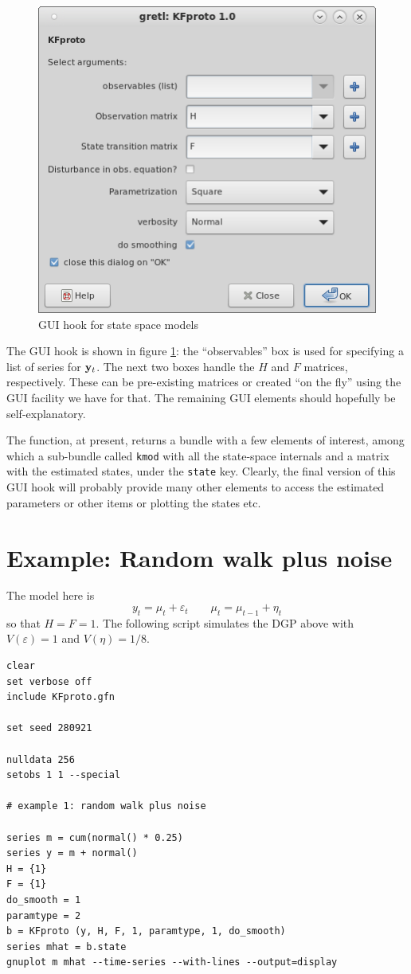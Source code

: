 \documentclass[a4paper]{article}
\newcommand{\obs}{\ensuremath\mathbf{y}_t}
\begin{document}
\begin{figure}[htbp]
  \centering
  \includegraphics[scale=0.5]{GUIScreenshot.png}
  \caption{GUI hook for state space models}
  \label{fig:GUI}
\end{figure}

The GUI hook is shown in figure \ref{fig:GUI}: the ``observables'' box
is used for specifying a list of series for $\obs$. The next two boxes
handle the $H$ and $F$ matrices, respectively. These can be
pre-existing matrices or created ``on the fly'' using the GUI facility
we have for that. The remaining GUI elements should hopefully be
self-explanatory.

The function, at present, returns a bundle with a few elements of
interest, among which a sub-bundle called \texttt{kmod} with all the
state-space internals and a matrix with the estimated states, under
the \texttt{state} key. Clearly, the final version of this GUI hook
will probably provide many other elements to access the estimated
parameters or other items or plotting the states etc.

\section*{Example: Random walk plus noise}

The model here is
\[
  y_t = \mu_t + \varepsilon_t \qquad \mu_t = \mu_{t-1} + \eta_t
\]
so that $H = F = 1$. The following script simulates the DGP above
with $V(\varepsilon) = 1$ and $V(\eta) = 1/8$.

\begin{verbatim}
clear
set verbose off
include KFproto.gfn

set seed 280921

nulldata 256
setobs 1 1 --special

# example 1: random walk plus noise

series m = cum(normal() * 0.25)
series y = m + normal()
H = {1}
F = {1}
do_smooth = 1
paramtype = 2
b = KFproto (y, H, F, 1, paramtype, 1, do_smooth)
series mhat = b.state
gnuplot m mhat --time-series --with-lines --output=display
\end{verbatim}
\end{document}
